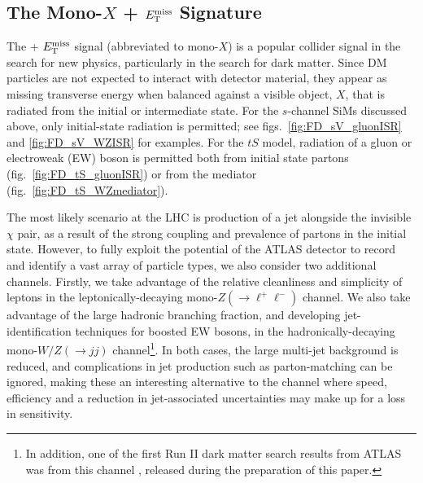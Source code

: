 \subsection{The Mono-$X$ + $E_{\mathrm{T}}^{\mathrm{miss}}$ Signature}
The \monoX + $E_{\mathrm{T}}^{\mathrm{miss}}$ signal (abbreviated to mono-$X$) is a popular collider signal in the search for new physics, particularly in the search for dark matter. Since DM particles are not expected to interact with detector material, they appear as missing transverse energy when balanced against a visible object, $X$, that is radiated from the initial or intermediate state. %
For the $s$-channel SiMs discussed above, only initial-state radiation is permitted; see figs.~\ref{fig:FD_sV_gluonISR} and \ref{fig:FD_sV_WZISR} for examples. For the $tS$ model, radiation of a gluon or electroweak (EW) boson is permitted both from initial state partons (fig.~\ref{fig:FD_tS_gluonISR}) or from the mediator (fig.~\ref{fig:FD_tS_WZmediator}).

The most likely scenario at the LHC is production of a jet alongside the invisible $\chi$ pair, as a result of the strong coupling and prevalence of partons in the initial state. However, to fully exploit the potential of the ATLAS detector to record and identify a vast array of particle types, we also consider two additional channels. Firstly, we take advantage of the relative cleanliness and simplicity of leptons in the leptonically-decaying mono-$Z(\rightarrow \ell^+ \ell^-)$ channel. We also take advantage of the large hadronic branching fraction, and developing jet-identification techniques for boosted EW bosons, in the hadronically-decaying mono-$W/Z(\rightarrow jj)$ channel\footnote{In addition, one of the first Run II dark matter search results from ATLAS was from this channel \cite{monoWZ_run2}, released during the preparation of this paper.}. In both cases, the large multi-jet background is reduced, and complications in jet production such as parton-matching can be ignored, making these an interesting alternative to the \monojet channel where speed, efficiency and a reduction in jet-associated uncertainties may make up for a loss in sensitivity.


